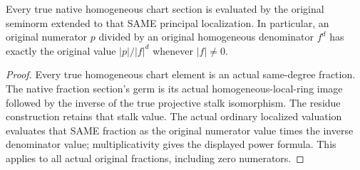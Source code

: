 \begin{theorem}
\label{thm:fc-graded-native-valued-fractions}
\leanok
{}
Every true native homogeneous chart section is evaluated by the original
seminorm extended to that SAME principal localization. In particular,
an original numerator $p$ divided by an original homogeneous denominator
$f^d$ has exactly the original value $|p|/|f|^d$ whenever $|f|\ne0$.
\end{theorem}
\begin{proof}
Every true homogeneous chart element is an actual same-degree fraction.
The native fraction section's germ is its actual homogeneous-local-ring
image followed by the inverse of the true projective stalk isomorphism.
The residue construction retains that stalk value. The actual ordinary
localized valuation evaluates that SAME fraction as the original
numerator value times the inverse denominator value; multiplicativity
gives the displayed power formula. This applies to all actual original
fractions, including zero numerators.
\end{proof}
